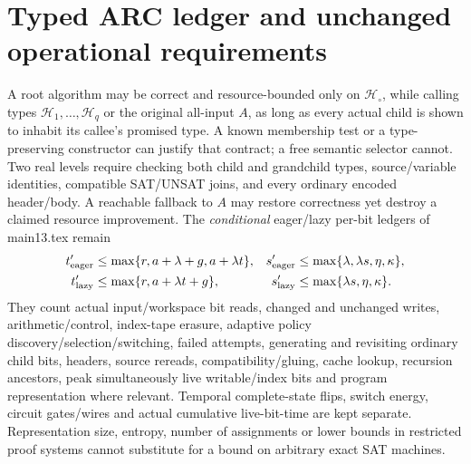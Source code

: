 \documentclass[11pt]{article}
\begin{document}
\section{Typed ARC ledger and unchanged operational requirements}
A root algorithm may be correct and resource-bounded only on \(\mathcal H_\circ\), while calling types \(\mathcal H_1,\ldots,\mathcal H_q\) or the original all-input \(A\), as long as every actual child is shown to inhabit its callee's promised type. A known membership test or a type-preserving constructor can justify that contract; a free semantic selector cannot. Two real levels require checking both child and grandchild types, source/variable identities, compatible SAT/UNSAT joins, and every ordinary encoded header/body. A reachable fallback to \(A\) may restore correctness yet destroy a claimed resource improvement.
The \emph{conditional} eager/lazy per-bit ledgers of main13.tex remain
\[
\begin{aligned}
t'_{\rm eager}&\le\max\{r,a+\lambda+g,a+\lambda t\},&
s'_{\rm eager}&\le\max\{\lambda,\lambda s,\eta,\kappa\},\\
t'_{\rm lazy}&\le\max\{r,a+\lambda t+g\},&
s'_{\rm lazy}&\le\max\{\lambda s,\eta,\kappa\}.
\end{aligned}
\]
They count actual input/workspace bit reads, changed and unchanged writes, arithmetic/control, index-tape erasure, adaptive policy discovery/selection/switching, failed attempts, generating and revisiting ordinary child bits, headers, source rereads, compatibility/gluing, cache lookup, recursion ancestors, peak simultaneously live writable/index bits and program representation where relevant. Temporal complete-state flips, switch energy, circuit gates/wires and actual cumulative live-bit-time are kept separate. Representation size, entropy, number of assignments or lower bounds in restricted proof systems cannot substitute for a bound on arbitrary exact SAT machines.
\end{document}
